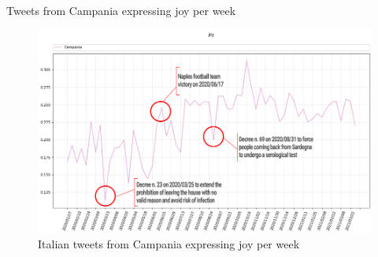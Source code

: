 \documentclass[8pt]{beamer}  %
\begin{document}
\begin{frame}{Tweets from Campania expressing joy per week}
    
    \begin{figure}
        \centering
        \includegraphics[scale=0.3]{assets/img/it_Campania_joy_with_events.png}
        \caption{Italian tweets from Campania expressing joy per week}
        \label{fig:it_Campania_joy}
    \end{figure}
    
\end{frame}
\end{document}
